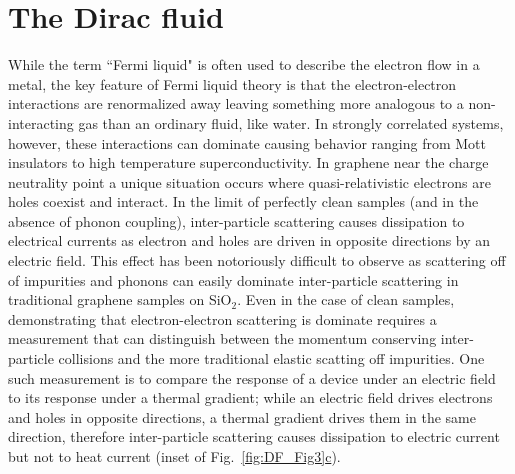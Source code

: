 \chapter{The Dirac fluid}
\label{ch:the_Dirac_fluid}

While the term ``Fermi liquid" is often used to describe the electron flow in a metal, the key feature of Fermi liquid theory is that the electron-electron interactions are renormalized away leaving something more analogous to a non-interacting gas than an ordinary fluid, like water. In strongly correlated systems, however, these interactions can dominate causing behavior ranging from Mott insulators to high temperature superconductivity. In graphene near the charge neutrality point a unique situation occurs where quasi-relativistic electrons are holes coexist and interact. In the limit of perfectly clean samples (and in the absence of phonon coupling), inter-particle scattering causes dissipation to electrical currents as electron and holes are driven in opposite directions by an electric field. This effect has been notoriously difficult to observe as scattering off of impurities and phonons can easily dominate inter-particle scattering in traditional graphene samples on SiO$_2$. Even in the case of clean samples, demonstrating that electron-electron scattering is dominate requires a measurement that can distinguish between the momentum conserving inter-particle collisions and the more traditional elastic scatting off impurities. One such measurement is to compare the response of a device under an electric field to its response under a thermal gradient; while an electric field drives electrons and holes in opposite directions, a thermal gradient drives them in the same direction, therefore inter-particle scattering causes dissipation to electric current but not to heat current (inset of Fig.~\hyperref[fig:DF_Fig3]{\ref*{fig:DF_Fig3}c}).


